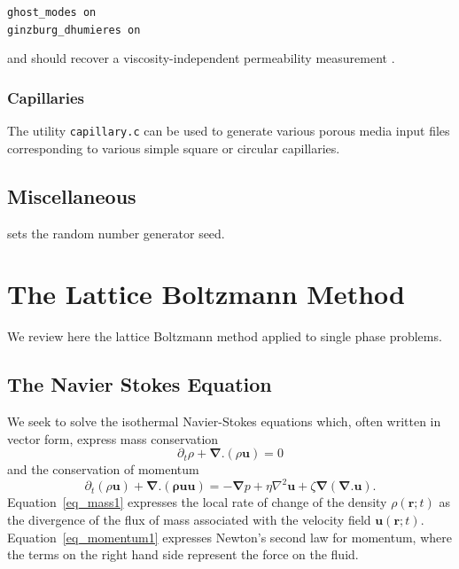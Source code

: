 \texttt{ghost\_modes on\\
ginzburg\_dhumieres on}

and should recover a viscosity-independent permeability measurement
\cite{lipanmiller,chunladd}.


\subsubsection{Capillaries}

The utility \texttt{capillary.c} can be used to generate various
porous media input files corresponding to various simple square
or circular capillaries.


\subsection{Miscellaneous}


sets the random number generator seed.




\section{The Lattice Boltzmann Method}

We review here the lattice Boltzmann method applied to single
phase problems.

\subsection{The Navier Stokes Equation}

We seek to solve the isothermal Navier-Stokes equations which, often
written in vector form, express mass conservation
\begin{equation}
\partial_t \rho + \boldsymbol{\nabla}.(\rho\mathbf{u}) = 0
\label{eq_mass1}
\end{equation}
and the conservation of momentum
\begin{equation}
\partial_t (\rho\mathbf{u}) + \boldsymbol{\nabla}.(\mathbf{\rho uu}) =
-\boldsymbol{\nabla}p + \eta \nabla^2 \mathbf{u}
+\zeta \boldsymbol{\nabla}(\boldsymbol{\nabla}.\mathbf{u}).
\label{eq_momentum1}
\end{equation}
Equation~\ref{eq_mass1} expresses the local rate of change of the
density $\rho(\mathbf{r}; t)$ as the divergence of the flux of
mass associated with the velocity field $\mathbf{u}(\mathbf{r}; t)$.
Equation~\ref{eq_momentum1} expresses Newton's second law for
momentum, where the terms on the right hand side represent the
force on the fluid.

